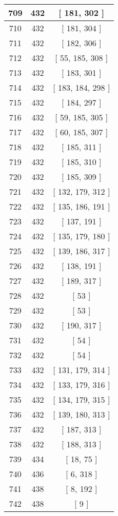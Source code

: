 \begin{center}
\begin{longtable}[H]{|| c c c ||}
\hline
709 & 432 & [ 181, 302 ] \\ 
\hline
710 & 432 & [ 181, 304 ] \\ 
\hline
711 & 432 & [ 182, 306 ] \\ 
\hline
712 & 432 & [ 55, 185, 308 ] \\ 
\hline
713 & 432 & [ 183, 301 ] \\ 
\hline
714 & 432 & [ 183, 184, 298 ] \\ 
\hline
715 & 432 & [ 184, 297 ] \\ 
\hline
716 & 432 & [ 59, 185, 305 ] \\ 
\hline
717 & 432 & [ 60, 185, 307 ] \\ 
\hline
718 & 432 & [ 185, 311 ] \\ 
\hline
719 & 432 & [ 185, 310 ] \\ 
\hline
720 & 432 & [ 185, 309 ] \\ 
\hline
721 & 432 & [ 132, 179, 312 ] \\ 
\hline
722 & 432 & [ 135, 186, 191 ] \\ 
\hline
723 & 432 & [ 137, 191 ] \\ 
\hline
724 & 432 & [ 135, 179, 180 ] \\ 
\hline
725 & 432 & [ 139, 186, 317 ] \\ 
\hline
726 & 432 & [ 138, 191 ] \\ 
\hline
727 & 432 & [ 189, 317 ] \\ 
\hline
728 & 432 & [ 53 ] \\ 
\hline
729 & 432 & [ 53 ] \\ 
\hline
730 & 432 & [ 190, 317 ] \\ 
\hline
731 & 432 & [ 54 ] \\ 
\hline
732 & 432 & [ 54 ] \\ 
\hline
733 & 432 & [ 131, 179, 314 ] \\ 
\hline
734 & 432 & [ 133, 179, 316 ] \\ 
\hline
735 & 432 & [ 134, 179, 315 ] \\ 
\hline
736 & 432 & [ 139, 180, 313 ] \\ 
\hline
737 & 432 & [ 187, 313 ] \\ 
\hline
738 & 432 & [ 188, 313 ] \\ 
\hline
739 & 434 & [ 18, 75 ] \\ 
\hline
740 & 436 & [ 6, 318 ] \\ 
\hline
741 & 438 & [ 8, 192 ] \\ 
\hline
742 & 438 & [ 9 ] \\ 

\end{longtable}
\end{center}
